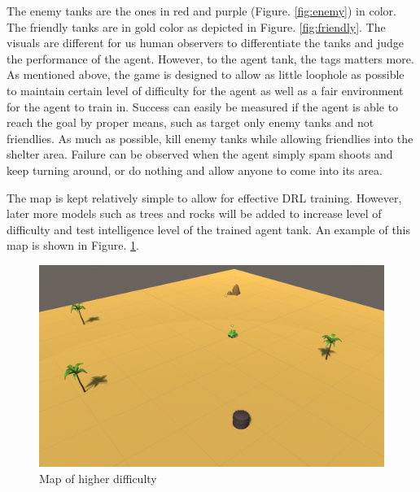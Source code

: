 The enemy tanks are the ones in red and purple (Figure. \ref{fig:enemy}) in color. The friendly tanks are in gold color as depicted in Figure. \ref{fig:friendly}. The visuals are different for us human observers to differentiate the tanks and judge the performance of the agent. However, to the agent tank, the tags matters more. As mentioned above, the game is designed to allow as little loophole as possible to maintain certain level of difficulty for the agent as well as a fair environment for the agent to train in. Success can easily be measured if the agent is able to reach the goal by proper means, such as target only enemy tanks and not friendlies. As much as possible, kill enemy tanks while allowing friendlies into the shelter area. Failure can be observed when the agent simply spam shoots and keep turning around, or do nothing and allow anyone to come into its area.

The map is kept relatively simple to allow for effective DRL training. However, later more models such as trees and rocks will be added to increase level of difficulty and test intelligence level of the trained agent tank. An example of this map is shown in Figure. \ref{fig:map_2}.

\begin{figure}
    \centering
    \includegraphics[height=0.5\columnwidth]{Chapter2/Map_2.pdf}\par
    \caption{Map of higher difficulty}
    \label{fig:map_2}
\end{figure}



